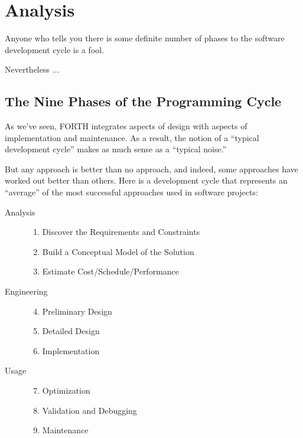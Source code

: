 

\chapter{Analysis}


Anyone who tells you there is some definite number of phases to the
software development cycle is a fool.

Nevertheless ...

\section{The Nine Phases of the Programming Cycle}

As we've seen, FORTH integrates aspects of design with aspects of
implementation and maintenance. As a result, the notion of a ``typical
development cycle'' makes as much sense as a ``typical noise.''

But any approach is better than no approach, and indeed, some
approaches have worked out better than others. Here is a development
cycle that represents an ``average'' of the most successful approaches
used in software projects:

\begin{description}
\item[Analysis] \hfill
    \begin{enumerate}
    \item Discover the Requirements and Constraints
    \item Build a Conceptual Model of the Solution
    \item Estimate Cost/Schedule/Performance
    \end{enumerate}
\item[Engineering] \hfill
    \begin{enumerate}
    \setcounter{enumi}{3}
    \item Preliminary Design
    \item Detailed Design
    \item Implementation
    \end{enumerate}
\item[Usage] \hfill
    \begin{enumerate}
    \setcounter{enumi}{6}
    \item Optimization
    \item Validation and Debugging
    \item Maintenance
    \end{enumerate}
\end{description}


